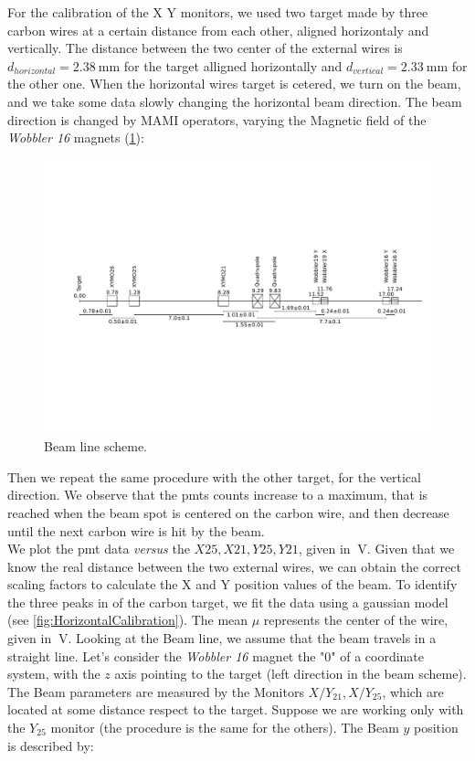 For the calibration of the X Y monitors, we used two target made by three carbon wires at a certain distance from each other, aligned horizontaly and vertically. The distance between the two center of the external wires is $ d_{horizontal} = \SI{2.38}{\milli \meter}$ for the target alligned horizontally and $d_{vertical} = \SI{2.33}{\milli \meter}$ for the other one.
When the horizontal wires target is cetered, we turn on the beam, and we take some data slowly changing the horizontal beam direction. The beam direction is changed by MAMI operators, varying the Magnetic field of the \textit{Wobbler 16} magnets (\ref{fig:BeamLine}):

\begin{figure}[hbtp]
\centering
\includegraphics[scale=0.4]{figures/XYMOCalibBeamLine.svg.pdf}
\caption{Beam line scheme.}
\label{fig:BeamLine}
\end{figure}


 Then we repeat the same procedure with the other target, for the vertical direction. We observe that the pmts counts increase to a maximum, that is reached when the beam spot is centered on the carbon wire, and then decrease until the next carbon wire is hit by the beam.\\
We plot the pmt data \textit{versus} the $X25,X21,Y25,Y21$, given in $\SI{}{\volt}$. 
Given that we know the real distance between the two external wires, we can obtain the correct scaling factors to calculate the X and Y position values ​​of the beam. To identify the three peaks in of the carbon target, we fit the data using a gaussian model (see \ref{fig:HorizontalCalibration}). The mean $\mu$ represents the center of the wire, given in $\SI{}{\volt}$.
Looking at the Beam line, we assume that the beam travels in a straight line. Let's consider the \textit{Wobbler 16} magnet the "$0$" of a coordinate system, with the $z$ axis pointing to the target (left direction in the beam scheme). The Beam parameters are measured by the Monitors $X/Y_{21}, X/Y_{25}$, which are located at some distance respect to the target. Suppose we are working only with the $Y_{25}$ monitor (the procedure is the same for the others). The Beam $y$ position is described by:

